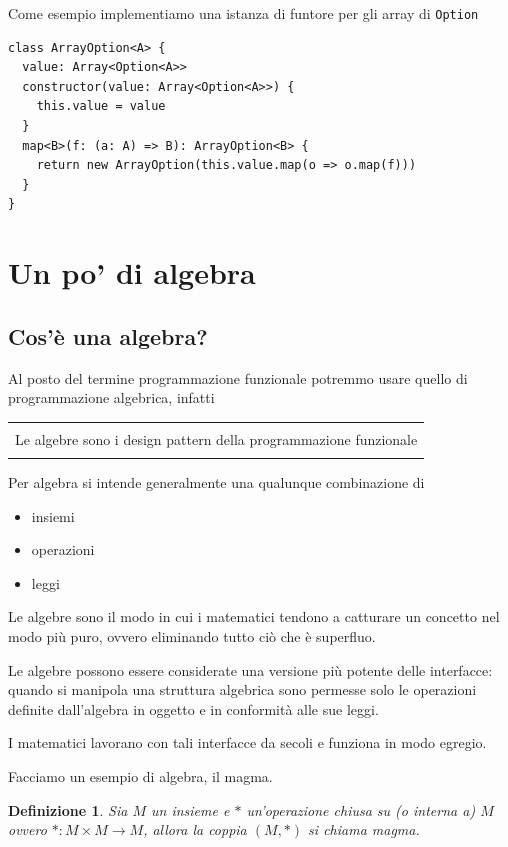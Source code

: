 \documentclass[12pt]{article}
\newtheorem{definition}{Definizione}
\newenvironment{boxed}
    {\begin{center}
    \begin{tabular}{|p{0.9\textwidth}|}
    \hline\\
    }
    {
    \\\\\hline
    \end{tabular}
    \end{center}
    }
\begin{document}
Come esempio implementiamo una istanza di funtore per gli array di \texttt{Option}

\begin{verbatim}
class ArrayOption<A> {
  value: Array<Option<A>>
  constructor(value: Array<Option<A>>) {
    this.value = value
  }
  map<B>(f: (a: A) => B): ArrayOption<B> {
    return new ArrayOption(this.value.map(o => o.map(f)))
  }
}
\end{verbatim}

\section{Un po' di algebra}

\subsection{Cos'è una algebra?}

Al posto del termine programmazione funzionale potremmo usare quello di programmazione algebrica, infatti

\begin{boxed}
Le algebre sono i design pattern della programmazione funzionale
\end{boxed}

Per algebra si intende generalmente una qualunque combinazione di

\begin{itemize}
  \item insiemi
  \item operazioni
  \item leggi
\end{itemize}

Le algebre sono il modo in cui i matematici tendono a catturare un concetto nel modo più puro,
ovvero eliminando tutto ciò che è superfluo.

Le algebre possono essere considerate una versione più potente delle interfacce: quando si manipola una struttura algebrica
sono permesse solo le operazioni definite dall'algebra in oggetto e in conformità alle sue leggi.

I matematici lavorano con tali interfacce da secoli e funziona in modo egregio.

Facciamo un esempio di algebra, il magma.

\begin{definition}
Sia $M$ un insieme e $*$ un'operazione \emph{chiusa su} (o \emph{interna a}) $M$ ovvero $*: M \times M \rightarrow M$,
allora la coppia $(M, *)$ si chiama \emph{magma}.
\end{definition}
\end{document}
